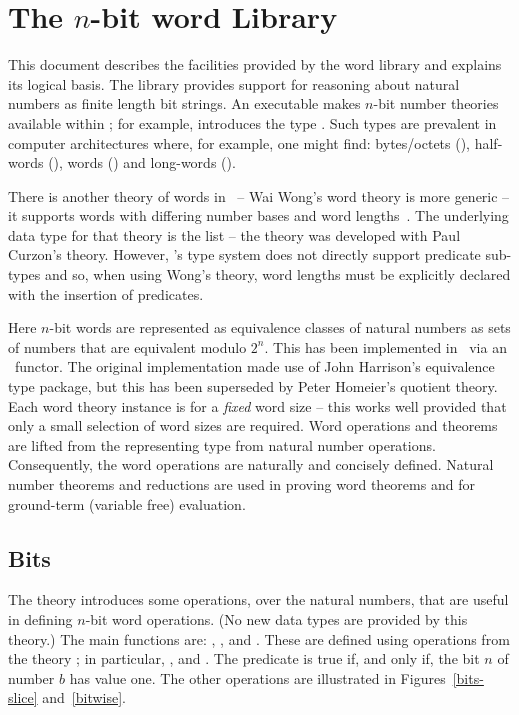 \chapter{The $n$-bit word Library}

\newcommand\ptt{\tt}

This document describes the facilities provided by the  word library and
explains its logical basis.
The library provides support for reasoning about natural numbers as finite length bit strings.  An executable  makes $n$-bit number theories available within \HOL; for example,  introduces the type .
Such types are prevalent in computer architectures where, for example, one might find: bytes/octets (), half-words (), words () and long-words ().

There is another theory of words in \HOL\ --  Wai Wong's word theory is more generic -- it supports words with differing number bases and word lengths~\cite{wong}.
The underlying data type for that theory is the list -- the theory was developed with Paul Curzon's  theory.
However, \HOL's type system does not directly support predicate sub-types and so, when using Wong's theory, word lengths must be explicitly declared with the insertion of predicates.

Here $n$-bit words are represented as equivalence classes of natural numbers \ie{} as sets of numbers that are equivalent modulo $2^n$.
This has been implemented in \HOL\ via an \ML\ functor.  The original implementation made use of John Harrison's equivalence type package, but this has been superseded by Peter Homeier's quotient theory.
Each word theory instance is for a \emph{fixed} word size -- this works well provided that only a small selection of word sizes are required.
Word operations and theorems are lifted from the representing type \ie{} from natural number operations.
Consequently, the word operations are naturally and concisely defined.
Natural number theorems and reductions are used in proving word theorems and for ground-term (variable free) evaluation.

\section{Bits} \label{bits}

The  theory introduces some operations, over the natural numbers, that are useful in defining $n$-bit word operations.  (No new data types are provided by this theory.)
The main functions are: , ,  and .  These are defined using operations from the theory ; in particular, ,  and .
The predicate  is true if, and only if, the bit $n$ of number $b$ has value one.
The other operations are illustrated in Figures~\ref{bits-slice} and~\ref{bitwise}.
%
%
%
%

